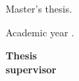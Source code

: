 

\thispagestyle{empty}

\begin{center}
  \large  


  \begingroup
  \huge{\miTitulo} \\
  \bigskip
  
  \endgroup

  \textrm{\miNombre}


\end{center}  

\newpage
\thispagestyle{empty}

\hfill

\vfill

\miNombre\ \ \ \textit{\miTitulo}

Master's thesis.

Academic year \miCurso.\\

\begin{minipage}[t]{0.25\textwidth}
  \flushleft
  \textbf{Thesis\\ supervisor}
\end{minipage}
\begin{minipage}[t]{0.40\textwidth}
  \flushleft
  \miTutor
\end{minipage}
\begin{minipage}[t]{0.35\textwidth}
  \flushright
  \miGrado
  \medskip

  \miUniversidad
\end{minipage}
\begin{flushleft}
\end{flushleft}

\endinput

